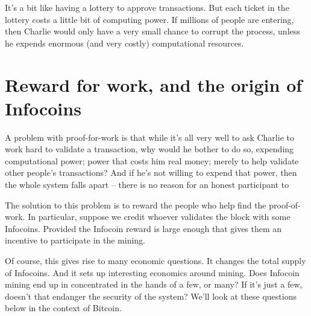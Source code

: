 \documentclass[12pt]{book}
\newcounter{problem}[chapter]
\begin{document}
It's a bit like having a lottery to approve transactions.  But each
ticket in the lottery costs a little bit of computing power.  If
millions of people are entering, then Charlie would only have a very
small chance to corrupt the process, unless he expends enormous (and
very costly) computational resources.

\section{Reward for work, and the origin of Infocoins}

A problem with proof-for-work is that while it's all very well to ask
Charlie to work hard to validate a transaction, why would he bother to
do so, expending computational power; power that costs him real money;
merely to help validate other people's transactions?  And if he's not
willing to expend that power, then the whole system falls apart --
there is no reason for an honest participant to

The solution to this problem is to reward the people who help find the
proof-of-work.  In particular, suppose we credit whoever validates the
block with some Infocoins.  Provided the Infocoin reward is large
enough that gives them an incentive to participate in the mining.

Of course, this gives rise to many economic questions.  It changes the
total supply of Infocoins.  And it sets up interesting economics
around mining.  Does Infocoin mining end up in concentrated in the
hands of a few, or many?  If it's just a few, doesn't that endanger
the security of the system?  We'll look at these questions below in
the context of Bitcoin.  
\end{document}
